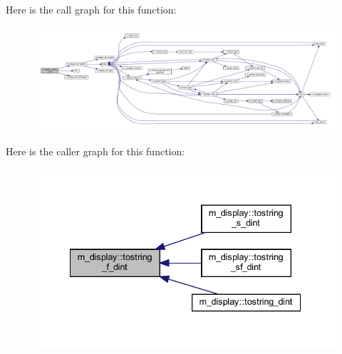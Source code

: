 Here is the call graph for this function\+:
\nopagebreak
\begin{figure}[H]
\begin{center}
\leavevmode
\includegraphics[width=350pt]{namespacem__display_ac1dd519655fda1c495ba40efe16fbc0b_cgraph}
\end{center}
\end{figure}
Here is the caller graph for this function\+:
\nopagebreak
\begin{figure}[H]
\begin{center}
\leavevmode
\includegraphics[width=335pt]{namespacem__display_ac1dd519655fda1c495ba40efe16fbc0b_icgraph}
\end{center}
\end{figure}
\mbox{\label{namespacem__display_aa23f6d3ab75d3383a0e95a4582cedc87}} 
